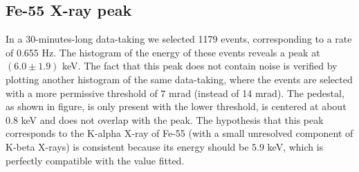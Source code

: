 \documentclass[12pt]{article}
\begin{document}
\subsection{Fe-55 X-ray peak}
In a 30-minutes-long data-taking we selected 1179 events, corresponding to a rate of 0.655 Hz. The histogram of the energy of these events reveals a peak at $(6.0 \pm 1.9)$ keV. The fact that this peak does not contain noise is verified by plotting another histogram of the same data-taking, where the events are selected with a more permissive threshold of $7$ mrad (instead of 14 mrad). The pedestal, as shown in figure, is only present with the lower threshold, is centered at about $0.8$ keV and does not overlap with the peak. The hypothesis that this peak corresponds to the K-alpha X-ray of Fe-55 (with a small unresolved component of K-beta X-rays) is consistent because its energy should be $5.9$ keV, which is perfectly compatible with the value fitted.
\end{document}
